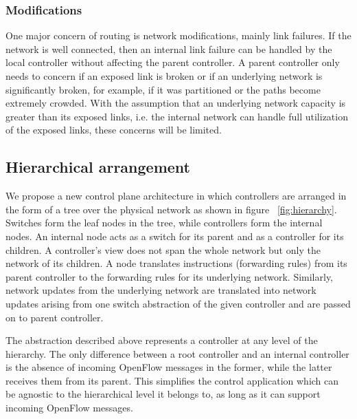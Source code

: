 \documentclass[10pt, twocolumn]{article}
\begin{document}
\subsubsection{Modifications}
One major concern of routing is network modifications, mainly link failures. If the network is well connected, then an internal link failure can be handled by the local controller without affecting the parent controller. A parent controller only needs to concern if an exposed link is broken or if an underlying network is significantly broken, for example, if it was partitioned or the paths become extremely crowded. With the assumption that an underlying network capacity is greater than its exposed links, i.e. the internal network can handle full utilization of the exposed links, these concerns will be limited.

\subsection{Hierarchical arrangement}
We propose a new control plane architecture in which controllers are arranged in the form of a tree over the physical network as shown in figure ~\ref{fig:hierarchy}. Switches form the leaf nodes in the tree, while controllers form the internal nodes. An internal node acts as a switch for its parent and as a controller for its children. A controller's view does not span the whole network but only the network of its children. A node translates instructions (forwarding rules) from its parent controller to the forwarding rules for its underlying network. Similarly, network updates from the underlying network are translated into network updates arising from one switch abstraction of the given controller and are passed on to parent controller.

The abstraction described above represents a controller at any level of the hierarchy. The only difference between a root controller and an internal controller is the absence of incoming OpenFlow messages in the former, while the latter receives them from its parent. This simplifies the control application which can be agnostic to the hierarchical level it belongs to, as long as it can support incoming OpenFlow messages.
\end{document}
